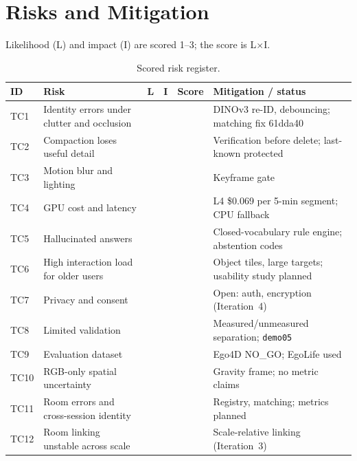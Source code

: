 \section{Risks and Mitigation}
Likelihood (L) and impact (I) are scored 1--3; the score is L$\times$I.
\begin{table}[H]\centering\footnotesize
\caption{Scored risk register.}\label{tab:risk-register}
\begin{tabularx}{\textwidth}{@{}l Y l l l Y@{}}\toprule
{}\textbf{ID} & \textbf{Risk} & \textbf{L} & \textbf{I} & \textbf{Score} & \textbf{Mitigation / status}\\\midrule
TC1 & Identity errors under clutter and occlusion &  &  &  & DINOv3 re-ID, debouncing; matching fix 61dda40\\
TC2 & Compaction loses useful detail &  &  &  & Verification before delete; last-known protected\\
TC3 & Motion blur and lighting &  &  &  & Keyframe gate\\
TC4 & GPU cost and latency &  &  &  & L4 \$0.069 per 5-min segment; CPU fallback\\
TC5 & Hallucinated answers &  &  &  & Closed-vocabulary rule engine; abstention codes\\
TC6 & High interaction load for older users &  &  &  & Object tiles, large targets; usability study planned\\
TC7 & Privacy and consent &  &  &  & Open: auth, encryption (Iteration~4)\\
TC8 & Limited validation &  &  &  & Measured/unmeasured separation; \texttt{demo05}\\
TC9 & Evaluation dataset &  &  &  & Ego4D NO\_GO; EgoLife used\\
TC10 & RGB-only spatial uncertainty &  &  &  & Gravity frame; no metric claims\\
TC11 & Room errors and cross-session identity &  &  &  & Registry, matching; metrics planned\\
TC12 & Room linking unstable across scale &  &  &  & Scale-relative linking (Iteration~3)\\
\bottomrule\end{tabularx}\end{table}


